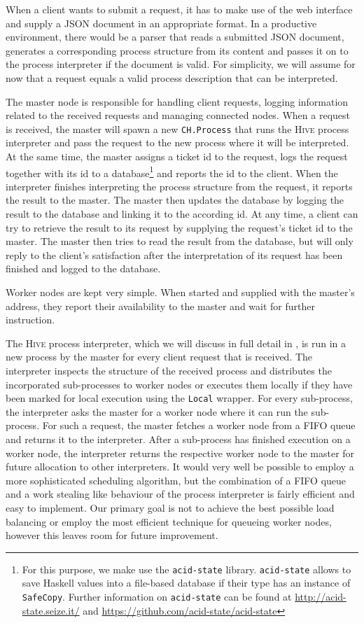 When a client wants to submit a request, it has to make use of the web interface and supply a JSON document in an appropriate format. In a productive environment, there would be a parser that reads a submitted JSON document, generates a corresponding process structure from its content and passes it on to the process interpreter if the document is valid. For simplicity, we will assume for now that a request equals a valid process description that can be interpreted.

The master node is responsible for handling client requests, logging information related to the received requests and managing connected nodes. When a request is received, the master will spawn a new \texttt{CH.Process} that runs the \textsc{Hive} process interpreter and pass the request to the new process where it will be interpreted. At the same time, the master assigns a ticket id to the request, logs the request together with its id to a database\footnote{For this purpose, we make use the \texttt{acid-state} library. \texttt{acid-state} allows to save Haskell values into a file-based database if their type has an instance of \texttt{SafeCopy}. Further information on \texttt{acid-state} can be found at \url{http://acid-state.seize.it/} and \url{https://github.com/acid-state/acid-state}} and reports the id to the client. When the interpreter finishes interpreting the process structure from the request, it reports the result to the master. The master then updates the database by logging the result to the database and linking it to the according id. At any time, a client can try to retrieve the result to its request by supplying the request's ticket id to the master. The master then tries to read the result from the database, but will only reply to the client's satisfaction after the interpretation of its request has been finished and logged to the database.

Worker nodes are kept very simple. When started and supplied with the master's address, they report their availability to the master and wait for further instruction.

The \textsc{Hive} process interpreter, which we will discuss in full detail in , is run in a new process by the master for every client request that is received. The interpreter inspects the structure of the received process and distributes the incorporated sub-processes to worker nodes or executes them locally if they have been marked for local execution using the \texttt{Local} wrapper. For every sub-process, the interpreter asks the master for a worker node where it can run the sub-process. For such a request, the master fetches a worker node from a FIFO queue and returns it to the interpreter. After a sub-process has finished execution on a worker node, the interpreter returns the respective worker node to the master for future allocation to other interpreters. It would very well be possible to employ a more sophisticated scheduling algorithm, but the combination of a FIFO queue and a work stealing like \cite{} behaviour of the process interpreter is fairly efficient and easy to implement. Our primary goal is not to achieve the best possible load balancing or employ the most efficient technique for queueing worker nodes, however this leaves room for future improvement.

